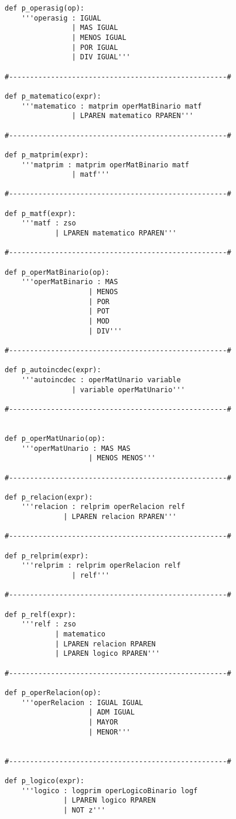 \begin{verbatim}
def p_operasig(op):
	'''operasig : IGUAL
				| MAS IGUAL
				| MENOS IGUAL
				| POR IGUAL
				| DIV IGUAL'''

#----------------------------------------------------#

def p_matematico(expr):
	'''matematico : matprim operMatBinario matf
				| LPAREN matematico RPAREN'''

#----------------------------------------------------#

def p_matprim(expr):		   
	'''matprim : matprim operMatBinario matf
				| matf'''

#----------------------------------------------------#

def p_matf(expr):
	'''matf : zso
			| LPAREN matematico RPAREN'''

#----------------------------------------------------#

def p_operMatBinario(op):
	'''operMatBinario : MAS
					| MENOS
					| POR
					| POT
					| MOD
					| DIV'''

#----------------------------------------------------#

def p_autoincdec(expr):
	'''autoincdec : operMatUnario variable
				| variable operMatUnario'''

#----------------------------------------------------#


def p_operMatUnario(op):
	'''operMatUnario : MAS MAS
					| MENOS MENOS'''

#----------------------------------------------------#

def p_relacion(expr):
	'''relacion : relprim operRelacion relf
			  | LPAREN relacion RPAREN'''

#----------------------------------------------------#

def p_relprim(expr):		   
	'''relprim : relprim operRelacion relf
				| relf'''

#----------------------------------------------------#

def p_relf(expr):
	'''relf : zso
			| matematico
			| LPAREN relacion RPAREN
			| LPAREN logico RPAREN'''

#----------------------------------------------------#

def p_operRelacion(op):
	'''operRelacion : IGUAL IGUAL
					| ADM IGUAL
					| MAYOR
					| MENOR'''


#----------------------------------------------------#

def p_logico(expr):
	'''logico : logprim operLogicoBinario logf
			  | LPAREN logico RPAREN
			  | NOT z'''


\end{verbatim}
